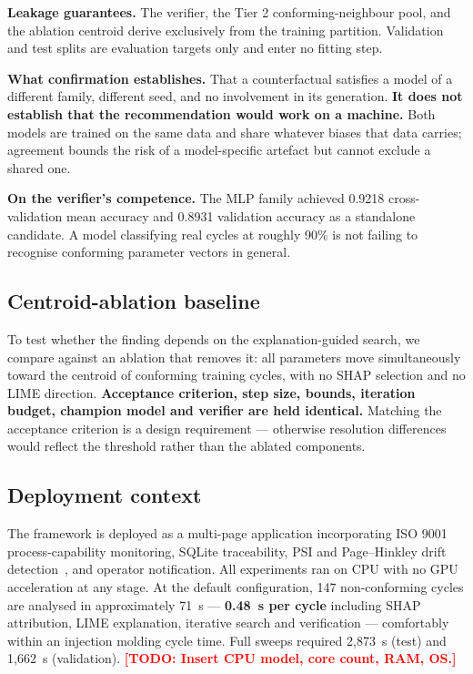 \documentclass[11pt,a4paper]{article}
\newcommand{\TODO}[1]{\textcolor{red}{\textbf{[TODO: #1]}}}
\begin{document}
\textbf{Leakage guarantees.} The verifier, the Tier 2 conforming-neighbour pool, and the ablation centroid derive exclusively from the training partition. Validation and test splits are evaluation targets only and enter no fitting step.

\textbf{What confirmation establishes.} That a counterfactual satisfies a model of a different family, different seed, and no involvement in its generation. \textbf{It does not establish that the recommendation would work on a machine.} Both models are trained on the same data and share whatever biases that data carries; agreement bounds the risk of a model-specific artefact but cannot exclude a shared one.

\textbf{On the verifier's competence.} The MLP family achieved 0.9218 cross-validation mean accuracy and 0.8931 validation accuracy as a standalone candidate. A model classifying real cycles at roughly 90\% is not failing to recognise conforming parameter vectors in general.

\subsection{Centroid-ablation baseline}

To test whether the finding depends on the explanation-guided search, we compare against an ablation that removes it: all parameters move simultaneously toward the centroid of conforming training cycles, with no SHAP selection and no LIME direction. \textbf{Acceptance criterion, step size, bounds, iteration budget, champion model and verifier are held identical.} Matching the acceptance criterion is a design requirement --- otherwise resolution differences would reflect the threshold rather than the ablated components.

\subsection{Deployment context}

The framework is deployed as a multi-page application incorporating ISO 9001 process-capability monitoring, SQLite traceability, PSI and Page--Hinkley drift detection~\cite{page1954}, and operator notification. All experiments ran on CPU with no GPU acceleration at any stage. At the default configuration, 147 non-conforming cycles are analysed in approximately 71~s --- \textbf{0.48~s per cycle} including SHAP attribution, LIME explanation, iterative search and verification --- comfortably within an injection molding cycle time. Full sweeps required 2{,}873~s (test) and 1{,}662~s (validation). \TODO{Insert CPU model, core count, RAM, OS.}
\end{document}
